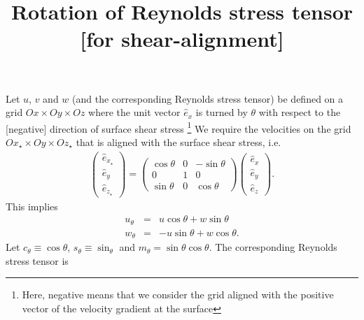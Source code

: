 \documentclass[a4paper,12pt]{article}
\title{Rotation of Reynolds stress tensor [for shear-alignment]}
\begin{document}
 
Let $u$, $v$ and $w$ (and the corresponding Reynolds stress tensor) 
be defined on a grid $Ox \times Oy \times Oz$ where the unit vector 
$\hat{e}_x$ is turned by $\theta$ with respect to the [negative] 
direction of surface shear stress \footnote{Here, negative means that we 
consider the grid aligned with the positive vector of the velocity gradient 
at the surface}
We require the velocities on the grid $Ox_\star \times Oy \times Oz_\star$ 
that is aligned with the surface shear stress, i.e. 
\begin{align}  
  \left(\begin{array}{c}
    \hat{e}_{x_\star}\\
    \hat{e}_y\\
    \hat{e}_{z_\star}
  \end{array} \right) = \left(\begin{array}{ccc}
    \cos\theta& 0 &-\sin\theta \\ 
    0 & 1 & 0 \\
    \sin\theta & 0 & \cos\theta 
  \end{array} \right)\left(\begin{array}{c} 
    \hat{e}_x \\ \hat{e}_y \\ \hat{e}_z
   \end{array}\right). 
\end{align} 
This implies 
\begin{eqnarray*} 
  u_\theta&=&u\cos\theta  +w\sin\theta \\ 
  w_\theta&=&-u\sin\theta +w\cos\theta. 
\end{eqnarray*}  
Let $c_\theta\equiv \cos\theta$, $s_\theta\equiv \sin_\theta$ and $m_\theta=\sin\theta\cos\theta$.
The corresponding Reynolds stress tensor is 
\end{document}

